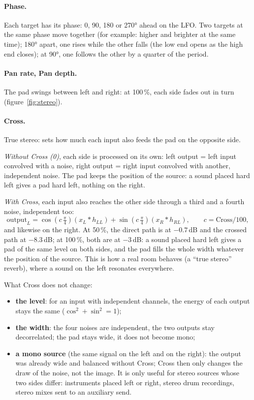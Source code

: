 \documentclass[a4paper,11pt]{article}
\newcommand{\dB}{\,dB}
\begin{document}
\paragraph{Phase.} Each target has its phase: 0, 90, 180 or 270° ahead on the LFO. Two targets at
the same phase move together (for example: higher and brighter at the same time); 180° apart, one
rises while the other falls (the low end opens as the high end closes); at 90°, one follows the
other by a quarter of the period.

\paragraph{Pan rate, Pan depth.} The pad swings between left and right: at 100\,\%, each side fades
out in turn (figure~\ref{fig:stereo}).

\paragraph{Cross.} True stereo: sets how much each input also feeds the pad on the opposite
side.

\emph{Without Cross (0)}, each side is processed on its own: left output = left input convolved
with a noise, right output = right input convolved with another, independent noise. The pad keeps
the position of the source: a sound placed hard left gives a pad hard left, nothing on the right.

\emph{With Cross}, each input also reaches the other side through a third and a fourth noise,
independent too:
\[
\text{output}_L = \cos\!\left(c\,\tfrac{\pi}{4}\right) (x_L * h_{LL})
               + \sin\!\left(c\,\tfrac{\pi}{4}\right) (x_R * h_{RL}),
\qquad c = \text{Cross} / 100,
\]
and likewise on the right. At 50\,\%, the direct path is at $-0.7$\dB{} and the crossed path at
$-8.3$\dB; at 100\,\%, both are at $-3$\dB: a sound placed hard left gives a pad of the same level
on both sides, and the pad fills the whole width whatever the position of the source. This is how
a real room behaves (a ``true stereo'' reverb), where a sound on the left resonates everywhere.

What Cross does not change:
\begin{itemize}
\item \textbf{the level}: for an input with independent channels, the energy of each output stays
  the same ($\cos^2 + \sin^2 = 1$);
\item \textbf{the width}: the four noises are independent, the two outputs stay decorrelated; the
  pad stays wide, it does not become mono;
\item \textbf{a mono source} (the same signal on the left and on the right): the output was
  already wide and balanced without Cross; Cross then only changes the draw of the noise, not the
  image. It is only useful for stereo sources whose two sides differ: instruments placed left or
  right, stereo drum recordings, stereo mixes sent to an auxiliary send.
\end{itemize}
\end{document}
